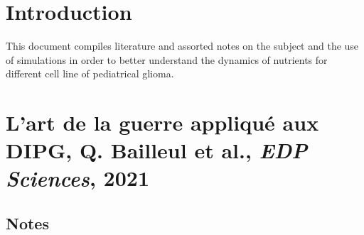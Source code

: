 \documentclass[11pt,a4paper]{article}
\begin{document}
\tableofcontents

\section*{Introduction}
This document compiles literature and assorted notes on the subject and the use of simulations in order to better understand the dynamics of nutrients for different cell line of pediatrical glioma.

\section*{L’art de la guerre appliqué aux DIPG, Q. Bailleul et al., \textit{EDP Sciences}, 2021}
\subsection*{Notes}
\end{document}
